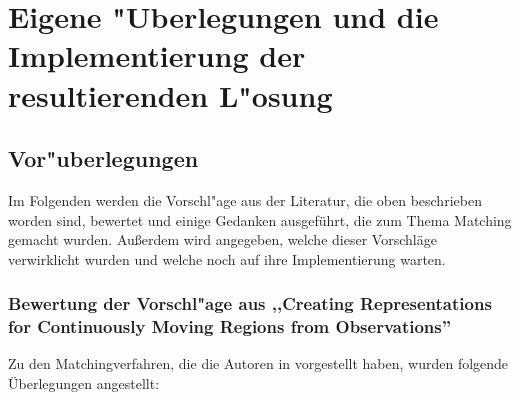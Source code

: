 \chapter[Eigene "Uberlegungen und die Implementierung]{Eigene "Uberlegungen und die Implementierung der resultierenden L"osung}
\minitoc
\newpage
\section{Vor"uberlegungen} \label{vorueberlegungen}
Im Folgenden werden die Vorschl"age aus der Literatur, die oben beschrieben worden sind, bewertet und einige Gedanken ausgeführt, die zum Thema Matching gemacht wurden. Außerdem wird  angegeben, welche dieser Vorschläge verwirklicht wurden und welche noch auf ihre Implementierung warten.

\subsection[Bewertung der Vorschl"age aus \cite{TG}]{Bewertung der Vorschl"age aus ,,Creating Representations for Continuously Moving Regions from Observations''\cite{TG}}

Zu den Matchingverfahren, die die Autoren in \cite{TG} vorgestellt haben, wurden folgende Überlegungen angestellt:

